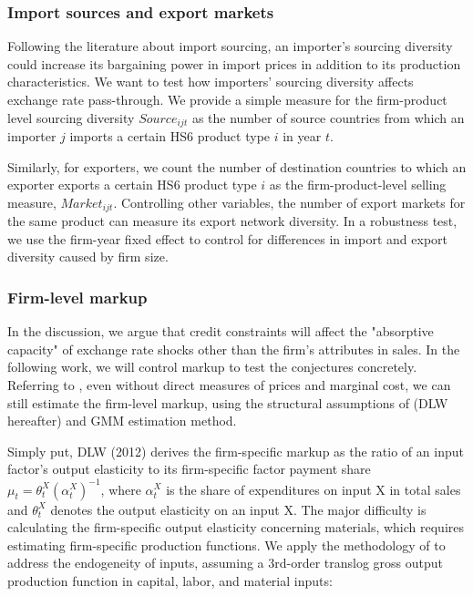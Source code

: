 \documentclass[12pt]{article}
\begin{document}
\subsubsection{Import sources and export markets}
Following the literature about import sourcing, an importer's sourcing diversity could increase its bargaining power in import prices in addition to its production characteristics. We want to test how importers' sourcing diversity affects exchange rate pass-through. We provide a simple measure for the firm-product level sourcing diversity $Source_{ijt}$ as the number of source countries from which an importer $j$ imports a certain HS6 product type $i$ in year $t$. 

Similarly, for exporters, we count the number of destination countries to which an exporter exports a certain HS6 product type $i$ as the firm-product-level selling measure, $Market_{ijt}$. Controlling other variables, the number of export markets for the same product can measure its export network diversity. In a robustness test, we use the firm-year fixed effect to control for differences in import and export diversity caused by firm size.

\subsubsection{Firm-level markup}

In the discussion, we argue that credit constraints will affect the "absorptive capacity" of exchange rate shocks other than the firm's attributes in sales. In the following work, we will control markup to test the conjectures concretely. Referring to \cite{bkl2021}, even without direct measures of prices and marginal cost, we can still estimate the firm-level markup, using the structural assumptions of \cite{dlw2012} (DLW hereafter) and GMM estimation method.

Simply put, DLW (2012)\cite{dlw2012} derives the firm-specific markup as the ratio of an input factor's output elasticity to its firm-specific factor payment share $\mu_{t}=\theta_{t}^{X}\left(\alpha_{t}^{X}\right)^{-1}$, where $\alpha_{t}^{X}$ is the share of expenditures on input X in total sales and $\theta^X_t$ denotes the output elasticity on an input X. The major difficulty is calculating the firm-specific output elasticity concerning materials, which requires estimating firm-specific production functions. We apply the methodology of \cite{acf2015} to address the endogeneity of inputs, assuming a 3rd-order translog gross output production function in capital, labor, and material inputs:
\end{document}
